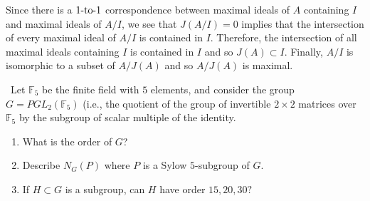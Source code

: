 \documentclass[12pt]{AlgebraQual}
\begin{document}
\begin{solution}
Since there is a $1\text{-to-}1$ correspondence between maximal ideals of $A$ containing $I$ and maximal ideals of $A/I$, we see that $J(A/I)=0$ implies that the intersection of every maximal ideal of $A/I$ is contained in $I$. Therefore, the intersection of all maximal ideals containing $I$ is contained in $I$ and so $J(A)\subset I$. Finally, $A/I$ is isomorphic to a subset of  $A/J(A)$ and so $A/J(A)$ is maximal.

\begin{comment}
which are exactly equivalent to $A/M$ for some maximal ideal $M.$

Since $J(A)\subset M$ for all $M$ (because the Jacobson is the intersection of all maximal ideals of $A$), we have that there is a $\oto$ correspondence between maximal ideals of $A$ and maximal ideals of $A/J(A)$.

However, clearly $A/J(A)\cong F^n$ since by the previous part, $J(A)$ contains all strictly upper triangular matrices so $A/J(A)$ is the set of diagonal matrices.

Therefore, the maximal ideals of $A/J(A)$ are exactly isomorphic to $F^{n-1}$.
These correspond to matrices in $A$ where exactly one component down the main diagonal is $0$.

Therefore, if $M_i$ is the maximal ideal corresponding to matrices $X\in A$ where $X_{ii}=0$, then $A/M_i$ is exactly the set of matrices $X$ where the $i\thh$ column is nonzero, and the $j\thh$ column is $0$ for all $j\not=i.$

Note that simple right $A$-modules would correspond exactly to matrices where a single row is nonzero.

Note further that all these simple $A$-modules will be isomorphic trivially since they are all isomorphic to $F$.


Finally, we get that the simple left $A$-modules are exactly $A/M$
\end{comment}

\end{solution}
\newpage



\begin{problem} $\,$
Let $\mathbb{F}_5$ be the finite field with $5$ elements, and consider the group $G=PGL_2(\mathbb{F}_5)$ (i.e., the quotient of the group of invertible $2\times 2$ matrices over $\mathbb{F}_5$ by the subgroup of scalar multiple of the identity.
\begin{enumerate}[label=(\alph*)]
    \item What is the order of $G$?
    \item Describe $N_G(P)$ where $P$ is a Sylow $5$-subgroup of $G$.
    \item If $H\subset G$ is a subgroup, can $H$ have order $15,20, 30?$
\end{enumerate}
\end{problem}
\end{document}
